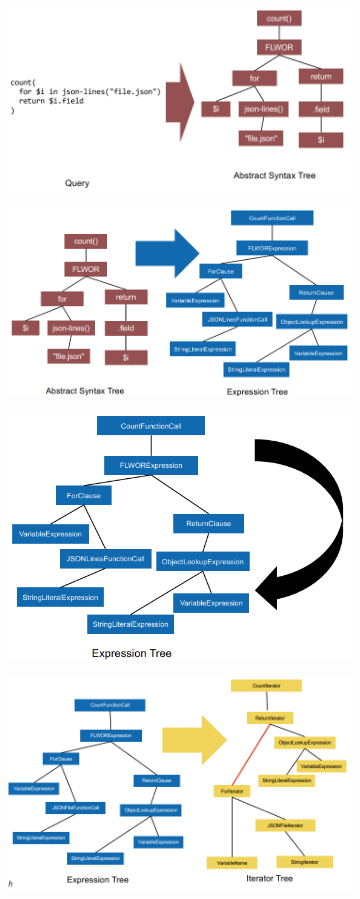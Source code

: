 \documentclass[11pt,oneside,a4paper]{article}
\begin{document}
{\begin{figure}[t!]
	\centering
	\begin{subfigure}[t]{.3\textwidth}
		\centering
		\includegraphics[width=1\linewidth]{figures/querytrees_processing_1}
	\end{subfigure}%
	\begin{subfigure}[t]{.3\textwidth}
		\centering
		\includegraphics[width=0.6\linewidth]{figures/querytrees_processing_2}
	\end{subfigure}
	\begin{subfigure}[t]{.3\textwidth}
		\centering
		\includegraphics[width=0.6\linewidth]{figures/querytrees_processing_3}
	\end{subfigure}
	\begin{subfigure}[t]{.3\textwidth}
		\centering
		\includegraphics[width=0.9\linewidth]{figures/querytrees_processing_4}

\end{subfigure}
\end{figure}}
\end{document}
